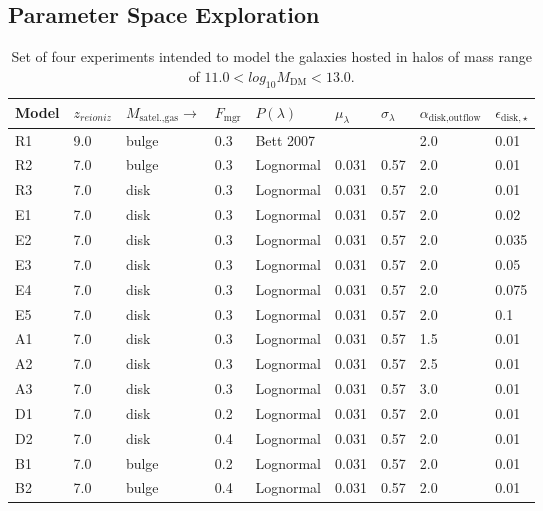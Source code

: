 \documentclass[usenatbib]{mn2e}
\begin{document}
\subsection{Parameter Space Exploration}
\label{sec:method:numericals}
\begin{table}\tiny
\centering
\resizebox{7in}{!} {
\begin{tabular}{|l|l|l|l|l|l|l|l|l|}
\hline
\hline
Model  &  $z_{reioniz}$ &  $M_{\text{satel.,gas}}\to$  & $F_{\text{mgr}}$ & $P(\lambda)$  &  $\mu_\lambda$
 & $\sigma_\lambda$  & $\alpha_{\text{disk,outflow}}$ & $\epsilon_{\text{disk},\star}$ \\
\hline
\hline
R1 & 9.0 &  bulge & 0.3 &Bett 2007 & &  & 2.0 & 0.01 \\
R2 & 7.0 &  bulge & 0.3 &Lognormal & 0.031 & 0.57 & 2.0 & 0.01 \\
R3 & 7.0 &  disk & 0.3 &Lognormal & 0.031  & 0.57 & 2.0 & 0.01 \\
\hline
E1 & 7.0 &  disk & 0.3 &Lognormal & 0.031 & 0.57 & 2.0 & 0.02 \\
E2 & 7.0 &  disk & 0.3 &Lognormal & 0.031 & 0.57 & 2.0 & 0.035 \\
E3 & 7.0 &  disk & 0.3 &Lognormal & 0.031 & 0.57 & 2.0 & 0.05 \\
E4 & 7.0 &  disk & 0.3 &Lognormal & 0.031 & 0.57 & 2.0 & 0.075 \\
E5 & 7.0 &  disk & 0.3 &Lognormal & 0.031 & 0.57 & 2.0 & 0.1 \\
\hline
A1 & 7.0 &  disk & 0.3 &Lognormal & 0.031 & 0.57 & 1.5 & 0.01 \\
A2 & 7.0 &  disk & 0.3 &Lognormal & 0.031 & 0.57 & 2.5 & 0.01 \\
A3 & 7.0 &  disk & 0.3 &Lognormal & 0.031 & 0.57 & 3.0 & 0.01 \\
\hline
D1 & 7.0 &  disk & 0.2 &Lognormal & 0.031 & 0.57 & 2.0 & 0.01 \\
D2 & 7.0 &  disk & 0.4 &Lognormal & 0.031 & 0.57 & 2.0 & 0.01 \\
\hline
B1 & 7.0 &  bulge & 0.2 &Lognormal & 0.031 & 0.57 & 2.0 & 0.01 \\
B2 & 7.0 &  bulge & 0.4 &Lognormal & 0.031 & 0.57 & 2.0 & 0.01 \\
\hline
\hline
\end{tabular}
}
\caption{Set of four experiments intended to model the galaxies hosted
  in  halos of mass range of $11.0<log_{10}
  M_{\text{DM}}<13.0$.\label{tab:runs}}  
\end{table}
\end{document}
